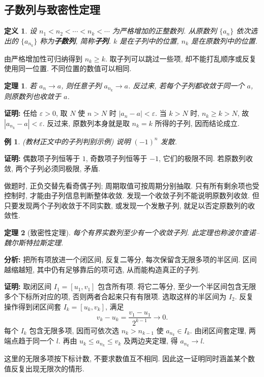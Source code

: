 \documentclass[UTF8,openany]{ctexbook}
\theoremstyle{chinesetextbook}
\newtheorem{definition}{定义}[section]
\newtheorem{example}{例}[section]
\newtheorem{theorem}{定理}[section]
\newenvironment{cnproof}{\par\indent\textbf{证明:} \ignorespaces}{\par}
\begin{document}
\subsection{子数列与致密性定理}
\begin{definition}
设 $n_1<n_2<\cdots<n_k<\cdots$ 为严格增加的正整数列. 从原数列 $\{a_n\}$ 依次选出的 $\{a_{n_k}\}$ 称为\textbf{子数列}, 简称\textbf{子列}. $k$ 是在子列中的位置, $n_k$ 是在原数列中的位置.
\end{definition}
由严格增加性可归纳得到 $n_k\ge k$. 取子列可以跳过一些项, 却不能打乱顺序或反复使用同一位置. 不同位置的数值可以相同.
\begin{theorem}
若 $a_n\to a$, 则任意子列 $a_{n_k}\to a$. 反过来, 若每个子列都收敛于同一个 $a$, 则原数列也收敛于 $a$.
\end{theorem}
\begin{cnproof}
任给 $\varepsilon>0$, 取 $N$ 使 $n>N$ 时 $|a_n-a|<\varepsilon$. 当 $k>N$ 时, $n_k\ge k>N$, 故 $|a_{n_k}-a|<\varepsilon$. 反过来, 原数列本身就是取 $n_k=k$ 所得的子列, 因而结论成立.
\end{cnproof}
\begin{example}
(教材正文中的子列判别示例) 说明 $(-1)^n$ 发散.
\end{example}
\begin{cnproof}
偶数项子列恒等于 $1$, 奇数项子列恒等于 $-1$, 它们的极限不同. 若原数列收敛, 两个子列必须同极限, 矛盾.
\end{cnproof}
做题时, 正负交替先看奇偶子列; 周期取值可按周期分别抽取. 只有所有剩余项也受控制时, 才能由子列信息判断整体收敛. 发现一个收敛子列不能说明原数列收敛. 但只要发现两个子列收敛于不同实数, 或发现一个发散子列, 就足以否定原数列的收敛性.
\begin{theorem}[致密性定理]
每个有界实数列至少有一个收敛子列. 此定理也称波尔查诺--魏尔斯特拉斯定理.
\end{theorem}
\par\indent\textbf{分析:} 把所有项放进一个闭区间, 反复二等分, 每次保留含无限多项的半区间. 区间越缩越短, 其中仍有足够靠后的项可选, 从而能构造真正的子列.
\begin{cnproof}
取闭区间 $I_1=[u_1,v_1]$ 包含所有项. 将它二等分, 至少一个半区间包含无限多个下标所对应的项, 否则两者合起来只有有限项. 选取这样的半区间为 $I_2$. 反复操作得到闭区间套 $I_k=[u_k,v_k]$, 满足
\[
v_k-u_k=\frac{v_1-u_1}{2^{k-1}}\longrightarrow0.
\]
每个 $I_k$ 包含无限多项, 因而可依次选 $n_k>n_{k-1}$ 使 $a_{n_k}\in I_k$. 由闭区间套定理, 两端点趋于同一个 $l$. 再由 $u_k\le a_{n_k}\le v_k$ 及两边夹定理, 得 $a_{n_k}\to l$.
\end{cnproof}
这里的无限多项按下标计数, 不要求数值互不相同. 因此这一证明同时涵盖某个数值反复出现无限次的情形.
\end{document}
